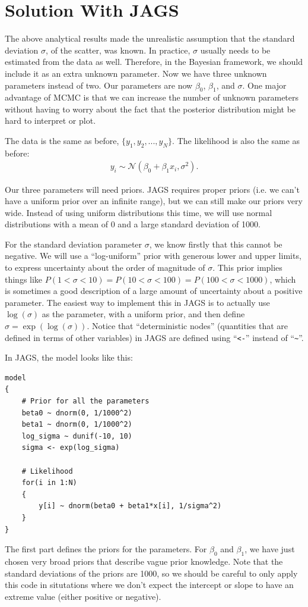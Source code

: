 \section{Solution With JAGS}
The above analytical results made the unrealistic assumption that the standard
deviation $\sigma$, of the scatter, was known. In practice, $\sigma$ usually needs to be
estimated from the data as well. Therefore, in the Bayesian framework, we should
include it as an extra unknown parameter. Now we have three unknown parameters instead
of two. Our parameters are now $\beta_0$, $\beta_1$, and $\sigma$.
One major advantage of MCMC is that we can increase the number of unknown parameters
without having to worry about the fact that the posterior distribution might
be hard to interpret or plot.

The data is the same as before, $\{y_1, y_2, ..., y_N\}$. The likelihood is
also the same as before:
\begin{eqnarray}
y_i \sim \mathcal{N}(\beta_0 + \beta_1 x_i, \sigma^2).
\end{eqnarray}

Our three parameters will need priors. JAGS requires proper priors (i.e. we
can't have a uniform prior over an infinite range), but we can still make our
priors very wide. Instead of using uniform distributions this time,
we will use normal distributions with a mean of 0 and a large standard deviation
of 1000.

For the standard deviation parameter $\sigma$, we know firstly that this cannot
be negative. We will use a ``log-uniform'' prior with generous lower and upper limits,
to express uncertainty about the order of magnitude of $\sigma$. This prior implies
things like $P(1 < \sigma < 10) = P(10 < \sigma < 100) = P(100 < \sigma < 1000)$,
which is sometimes a good description of a large amount of uncertainty about
a positive parameter. The easiest way to implement this in JAGS is to actually
use $\log(\sigma)$ as the parameter, with a uniform prior, and then define
$\sigma = \exp\left(\log(\sigma)\right)$. Notice that ``deterministic nodes''
(quantities that are defined in terms of other variables) in JAGS are defined
using ``{\tt <-}'' instead of ``{\tt \~{ }}''.

In JAGS, the model looks like this:
\begin{framed}
\begin{verbatim}
model
{
    # Prior for all the parameters
    beta0 ~ dnorm(0, 1/1000^2)
    beta1 ~ dnorm(0, 1/1000^2)
    log_sigma ~ dunif(-10, 10)
    sigma <- exp(log_sigma)

    # Likelihood
    for(i in 1:N)
    {
        y[i] ~ dnorm(beta0 + beta1*x[i], 1/sigma^2)
    }
}
\end{verbatim}
\end{framed}
The first part defines the priors for the parameters. For $\beta_0$ and $\beta_1$,
we have just chosen very broad priors that describe vague prior knowledge. Note
that the standard deviations of the priors are 1000, so we should be careful
to only apply this code in situtations where we don't expect the intercept or
slope to have an extreme value (either positive or negative).

